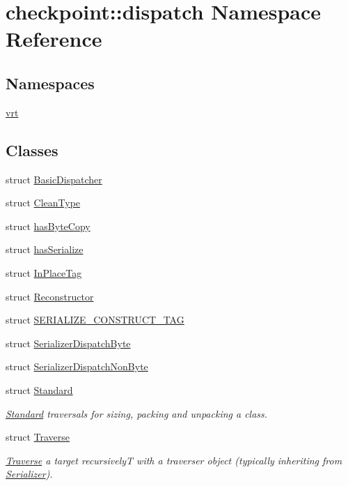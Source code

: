 \hypertarget{namespacecheckpoint_1_1dispatch}{}\section{checkpoint\+:\+:dispatch Namespace Reference}
\label{namespacecheckpoint_1_1dispatch}
\subsection*{Namespaces}
\begin{DoxyCompactItemize}
\item 
 \hyperlink{namespacecheckpoint_1_1dispatch_1_1vrt}{vrt}
\end{DoxyCompactItemize}
\subsection*{Classes}
\begin{DoxyCompactItemize}
\item 
struct \hyperlink{structcheckpoint_1_1dispatch_1_1_basic_dispatcher}{Basic\+Dispatcher}
\item 
struct \hyperlink{structcheckpoint_1_1dispatch_1_1_clean_type}{Clean\+Type}
\item 
struct \hyperlink{structcheckpoint_1_1dispatch_1_1has_byte_copy}{has\+Byte\+Copy}
\item 
struct \hyperlink{structcheckpoint_1_1dispatch_1_1has_serialize}{has\+Serialize}
\item 
struct \hyperlink{structcheckpoint_1_1dispatch_1_1_in_place_tag}{In\+Place\+Tag}
\item 
struct \hyperlink{structcheckpoint_1_1dispatch_1_1_reconstructor}{Reconstructor}
\item 
struct \hyperlink{structcheckpoint_1_1dispatch_1_1_s_e_r_i_a_l_i_z_e___c_o_n_s_t_r_u_c_t___t_a_g}{S\+E\+R\+I\+A\+L\+I\+Z\+E\+\_\+\+C\+O\+N\+S\+T\+R\+U\+C\+T\+\_\+\+T\+AG}
\item 
struct \hyperlink{structcheckpoint_1_1dispatch_1_1_serializer_dispatch_byte}{Serializer\+Dispatch\+Byte}
\item 
struct \hyperlink{structcheckpoint_1_1dispatch_1_1_serializer_dispatch_non_byte}{Serializer\+Dispatch\+Non\+Byte}
\item 
struct \hyperlink{structcheckpoint_1_1dispatch_1_1_standard}{Standard}
\begin{DoxyCompactList}\small\item\em \hyperlink{structcheckpoint_1_1dispatch_1_1_standard}{Standard} traversals for sizing, packing and unpacking a class. \end{DoxyCompactList}\item 
struct \hyperlink{structcheckpoint_1_1dispatch_1_1_traverse}{Traverse}
\begin{DoxyCompactList}\small\item\em \hyperlink{structcheckpoint_1_1dispatch_1_1_traverse}{Traverse} a target recursively{\ttfamily T} with a traverser object (typically inheriting from {\ttfamily \hyperlink{structcheckpoint_1_1_serializer}{Serializer}}). \end{DoxyCompactList}\end{DoxyCompactItemize}
